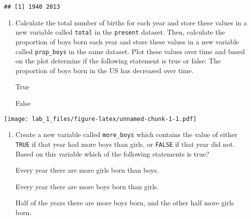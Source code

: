 \documentclass[
]{article}
\newenvironment{Shaded}{\begin{snugshade}}{\end{snugshade}}
\newcommand{\CommentTok}[1]{\textcolor[rgb]{0.56,0.35,0.01}{\textit{#1}}}
\newcommand{\FunctionTok}[1]{\textcolor[rgb]{0.13,0.29,0.53}{\textbf{#1}}}
\newcommand{\NormalTok}[1]{#1}
\newcommand{\OtherTok}[1]{\textcolor[rgb]{0.56,0.35,0.01}{#1}}
\newcommand{\SpecialCharTok}[1]{\textcolor[rgb]{0.81,0.36,0.00}{\textbf{#1}}}
\providecommand{\tightlist}{%
  \setlength{\itemsep}{0pt}\setlength{\parskip}{0pt}}
\begin{document}
\begin{verbatim}
## [1] 1940 2013
\end{verbatim}

\begin{enumerate}
\def\labelenumi{\arabic{enumi}.}
\setcounter{enumi}{4}
\tightlist
\item
  Calculate the total number of births for each year and store these
  values in a new variable called \texttt{total} in the \texttt{present}
  dataset. Then, calculate the proportion of boys born each year and
  store these values in a new variable called \texttt{prop\_boys} in the
  same dataset. Plot these values over time and based on the plot
  determine if the following statement is true or false: The proportion
  of boys born in the US has decreased over time.

  True

  False
\end{enumerate}

\begin{Shaded}
\end{Shaded}

\begin{Shaded}
\end{Shaded}

\texttt{[image: lab\_1\_files/figure-latex/unnamed-chunk-1-1.pdf]}

\begin{enumerate}
\def\labelenumi{\arabic{enumi}.}
\setcounter{enumi}{5}
\tightlist
\item
  Create a new variable called \texttt{more\_boys} which contains the
  value of either \texttt{TRUE} if that year had more boys than girls,
  or \texttt{FALSE} if that year did not. Based on this variable which
  of the following statements is true?

  Every year there are more girls born than boys.

  Every year there are more boys born than girls.

  Half of the years there are more boys born, and the other half more
  girls born.
\end{enumerate}
\end{document}
